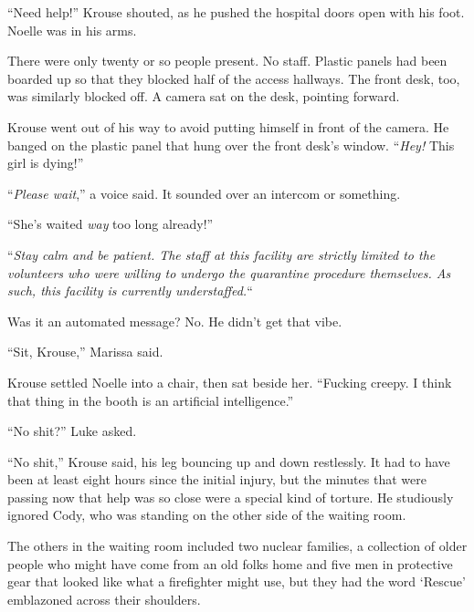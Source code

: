 ``Need help!'' Krouse shouted, as he pushed the hospital doors open with his foot.  Noelle was in his arms.



There were only twenty or so people present.  No staff.  Plastic panels had been boarded up so that they blocked half of the access hallways.  The front desk, too, was similarly blocked off.  A camera sat on the desk, pointing forward.



Krouse went out of his way to avoid putting himself in front of the camera.  He banged on the plastic panel that hung over the front desk's window.  ``\emph{Hey!  }This girl is dying!''



``\emph{Please wait},''  a voice said.  It sounded over an intercom or something.



``She's waited \emph{way} too long already!''



``\emph{Stay calm and be patient.  The staff at this facility are strictly limited to the volunteers who were willing to undergo the quarantine procedure themselves.  As such, this facility is currently understaffed.}``



Was it an automated message?  No.  He didn't get that vibe.



``Sit, Krouse,'' Marissa said.



Krouse settled Noelle into a chair, then sat beside her.  ``Fucking creepy.  I think that thing in the booth is an artificial intelligence.''



``No shit?'' Luke asked.



``No shit,'' Krouse said, his leg bouncing up and down restlessly.  It had to have been at least eight hours since the initial injury, but the minutes that were passing now that help was so close were a special kind of torture.  He studiously ignored Cody, who was standing on the other side of the waiting room.



The others in the waiting room included two nuclear families, a collection of older people who might have come from an old folks home and five men in protective gear that looked like what a firefighter might use, but they had the word `Rescue' emblazoned across their shoulders.



